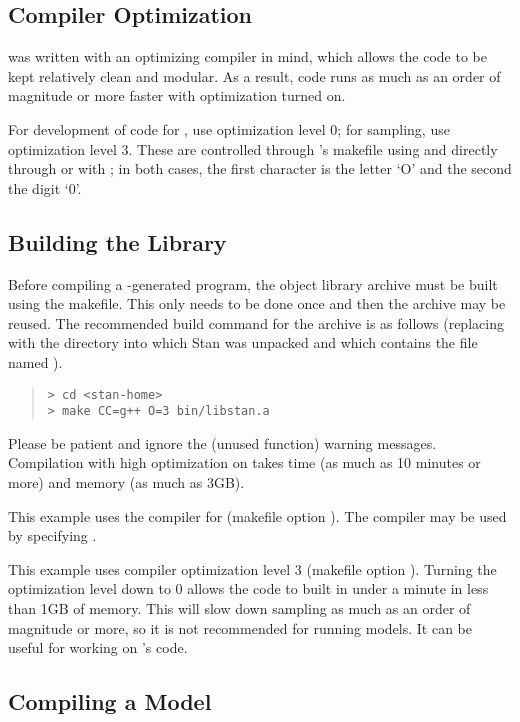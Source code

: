 \subsection{Compiler Optimization}

\Stan was written with an optimizing compiler in mind, which allows
the code to be kept relatively clean and modular.  As a result, \Stan
code runs as much as an order of magnitude or more faster with
optimization turned on.

For development of \Cpp code for \Stan, use optimization level 0; for
sampling, use optimization level 3.  These are controlled through
\Stan's makefile using  and directly through \clang or \gpp
with ; in both cases, the first character is the letter `O'
and the second the digit `0'.


\subsection{Building the \Stan Library}

Before compiling a \Stan-generated \Cpp program, the \Stan object
library archive must be built using the makefile.  This only needs to
be done once and then the archive may be reused.  The recommended
build command for the \Stan archive is as follows (replacing
 with the directory into which Stan was unpacked and
which contains the file named ).
%
\begin{quote}
\begin{Verbatim}[fontshape=sl]
> cd <stan-home>
> make CC=g++ O=3 bin/libstan.a 
\end{Verbatim}
\end{quote}
%
Please be patient and ignore the (unused function) warning messages.
Compilation with high optimization on  takes time (as much
as 10 minutes or more) and memory (as much as 3GB). 

This example uses the  compiler for \Cpp (makefile option
).  The \clang compiler may be used by specifying
.

This example uses compiler optimization level 3 (makefile option
).  Turning the optimization level down to 0 allows the code
to built in under a minute in less than 1GB of memory.  This will slow
down sampling as much as an order of magnitude or more, so it is not
recommended for running models.  It can be useful for working on
\Stan's \Cpp code.


\subsection{Compiling a \Stan Model}

